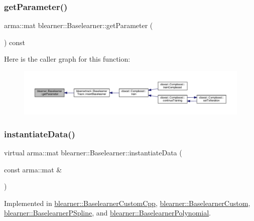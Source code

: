 \mbox{\label{classblearner_1_1_baselearner_a3362fe72e1b653ec3664cae2397414ed}} 
\subsubsection{\texorpdfstring{get\+Parameter()}{getParameter()}}
{\footnotesize\ttfamily arma\+::mat blearner\+::\+Baselearner\+::get\+Parameter (\begin{DoxyParamCaption}{ }\end{DoxyParamCaption}) const}

Here is the caller graph for this function\+:
\nopagebreak
\begin{figure}[H]
\begin{center}
\leavevmode
\includegraphics[width=350pt]{classblearner_1_1_baselearner_a3362fe72e1b653ec3664cae2397414ed_icgraph}
\end{center}
\end{figure}
\mbox{\label{classblearner_1_1_baselearner_af01f1b8c4540927705ff79c3649489f7}} 
\subsubsection{\texorpdfstring{instantiate\+Data()}{instantiateData()}}
{\footnotesize\ttfamily virtual arma\+::mat blearner\+::\+Baselearner\+::instantiate\+Data (\begin{DoxyParamCaption}\item[{const arma\+::mat \&}]{ }\end{DoxyParamCaption})\hspace{0.3cm}{\ttfamily [pure virtual]}}



Implemented in \hyperlink{classblearner_1_1_baselearner_custom_cpp_ae130d3b469eff32c8e0be12d925cf88f}{blearner\+::\+Baselearner\+Custom\+Cpp}, \hyperlink{classblearner_1_1_baselearner_custom_a83c25e681bb606ae4a36c249a36229b9}{blearner\+::\+Baselearner\+Custom}, \hyperlink{classblearner_1_1_baselearner_p_spline_a1a83493d31e14f7e28d0aba40a3f4396}{blearner\+::\+Baselearner\+P\+Spline}, and \hyperlink{classblearner_1_1_baselearner_polynomial_aacd6ba3b09ccf63a96d7bffa1d703710}{blearner\+::\+Baselearner\+Polynomial}.


